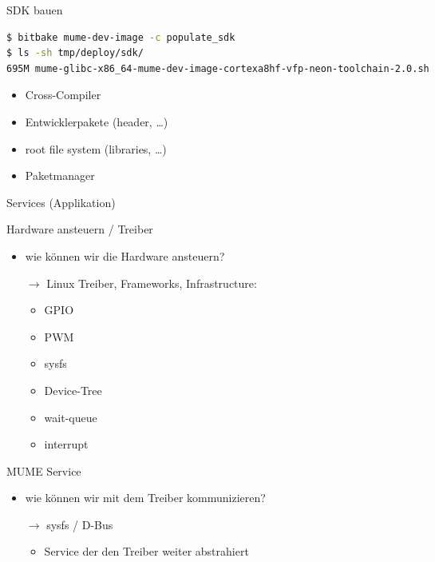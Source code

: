 \begin{frame}[fragile]{SDK bauen}
	\begin{lstlisting}[frame=single,language=bash, breaklines=true]
$ bitbake mume-dev-image -c populate_sdk
$ ls -sh tmp/deploy/sdk/
695M mume-glibc-x86_64-mume-dev-image-cortexa8hf-vfp-neon-toolchain-2.0.sh
	\end{lstlisting}
	\begin{itemize}
		\item Cross-Compiler
		\item Entwicklerpakete (header, \ldots)
		\item root file system (libraries, \ldots)
		\item Paketmanager
	\end{itemize}
\end{frame}

\begin{frame}{Services (Applikation)}
\end{frame}

\begin{frame}{Hardware ansteuern / Treiber}
	\begin{itemize}
		\item wie können wir die Hardware ansteuern?
		\item[$\rightarrow$] Linux Treiber, Frameworks, Infrastructure:
		\begin{itemize}
			\item GPIO
			\item PWM
			\item sysfs
			\item Device-Tree
			\item wait-queue
			\item interrupt
		\end{itemize}
	\end{itemize}
\end{frame}

\begin{frame}{MUME Service}
	\begin{itemize}
		\item wie können wir mit dem Treiber kommunizieren?
		\item[$\rightarrow$] sysfs / D-Bus
		\begin{itemize}
			\item Service der den Treiber weiter abstrahiert
		\end{itemize}
	\end{itemize}
\end{frame}

